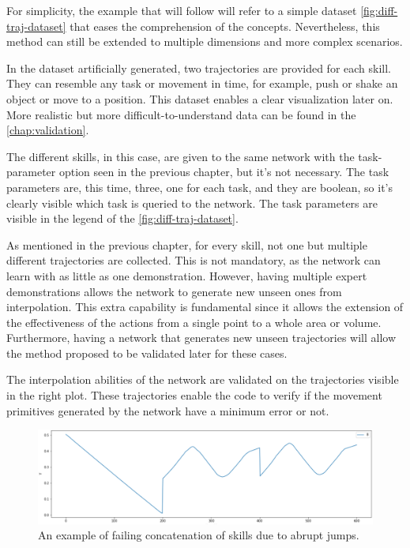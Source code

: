 For simplicity, the example that will follow will refer to a simple dataset \cref{fig:diff-traj-dataset} that eases the comprehension of the concepts. 
Nevertheless, this method can still be extended to multiple dimensions and more complex scenarios. 

In the dataset artificially generated, two trajectories are provided for each skill. They can resemble any task or movement in time, for example, push or shake an object or move to a position. This dataset enables a clear visualization later on. More realistic but more difficult-to-understand data can be found in the \cref{chap:validation}. 

The different skills, in this case, are given to the same network with the task-parameter option seen in the previous chapter, but it's not necessary. The task parameters are, this time, three, one for each task, and they are boolean, so it's clearly visible which task is queried to the network. The task parameters are visible in the legend of the \cref{fig:diff-traj-dataset}.

As mentioned in the previous chapter, for every skill, not one but multiple different trajectories are collected. This is not mandatory, as the network can learn with as little as one demonstration. 
However, having multiple expert demonstrations allows the network to generate new unseen ones from interpolation. This extra capability is fundamental since it allows the extension of the effectiveness of the actions from a single point to a whole area or volume. 
Furthermore, having a network that generates new unseen trajectories will allow the method proposed to be validated later for these cases.

The interpolation abilities of the network are validated on the trajectories visible in the right plot. These trajectories enable the code to verify if the movement primitives generated by the network have a minimum error or not. 

\begin{figure}
    \centering
    \includegraphics[width=0.9\linewidth]{figures/diff-traj-jump.png}
    \caption{ An example of failing concatenation of skills due to abrupt jumps. }
    \label{fig:diff-traj-jump}
\end{figure}

